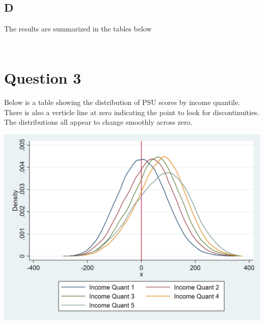 \documentclass[11pt]{article}
\begin{document}
\subsection{D } 

The results are summarized in the tables below 

\begin{center}
	\begin{tabular}{c | c | c|c} 
		\hline
		
		\hline
		
	\end{tabular}
\end{center}


\begin{center}
	\begin{tabular}{c | c | c|c} 
		\hline
		
		\hline
		
	\end{tabular}
\end{center}




\section{ Question 3}

Below is a table showing the distribution of PSU scores by income quantile. There is also a verticle line at zero indicating the point to look for discontinuities. The distributions all appear to change smoothly across zero. 


 	\includegraphics[width=1\linewidth]{3_plot.png}
\end{document}

